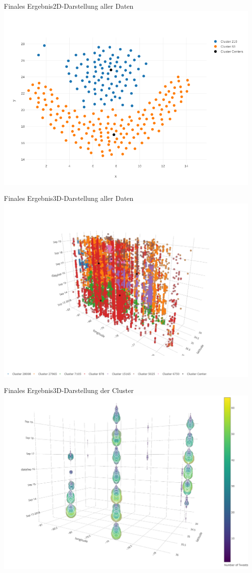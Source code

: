 \documentclass[12pt, xcolor={usenames,dvipsnames,svgnames,x11names,table}]{beamer}
\begin{document}
	\begin{frame}{Finales Ergebnis}{2D-Darstellung aller Daten}
		\center\includegraphics[width=.9\textwidth, clip=true, trim=0mm 0mm 0mm 30mm]{flame}
	\end{frame}	
	
	\begin{frame}{Finales Ergebnis}{3D-Darstellung aller Daten}
		\center\includegraphics[width=.9\textwidth, clip=true, trim=0mm 0mm 0mm 50mm]{twitter_3d}
	\end{frame}
	
	\begin{frame}{Finales Ergebnis}{3D-Darstellung der Cluster}
		\center\includegraphics[width=.8\textwidth, clip=true, trim=0mm 0mm 0mm 0mm]{twitter_3d_cluster_700}
	\end{frame}
	
\end{document}
